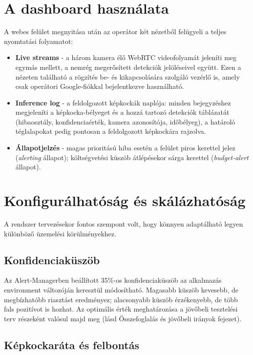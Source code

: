 \section{A dashboard használata}

A webes felület megnyitása után az operátor két nézetből felügyeli a teljes nyomtatási folyamatot:

\begin{itemize}
    \item \textbf{Live streams} - a három kamera élő WebRTC videofolyamát jeleníti meg egymás mellett, a nemrég megerősített
          detekciók jelöléseivel együtt. Ezen a nézeten található a rögzítés be- és kikapcsolására szolgáló vezérlő is,
          amely csak operátori Google-fiókkal bejelentkezve használható.
    \item \textbf{Inference log} - a feldolgozott képkockák naplója: minden bejegyzéshez megjeleníti a képkocka-bélyeget és
          a hozzá tartozó detekciók táblázatát (hibaosztály, konfidenciaérték, kamera azonosítója, időbélyeg), a határoló téglalapokat
          pedig pontosan a feldolgozott képkockára rajzolva.
    \item \textbf{Állapotjelzés} - magas prioritású hiba esetén a felület piros kerettel jelez (\textit{alerting}
          állapot); költségvetési küszöb átlépésekor sárga kerettel (\textit{budget-alert} állapot).
\end{itemize}

\section{Konfigurálhatóság és skálázhatóság}

A rendszer tervezésekor fontos szempont volt, hogy könnyen adaptálható legyen különböző üzemelési körülményekhez.

\subsection{Konfidenciaküszöb}

Az Alert-Managerben beállított 35\%-os konfidenciaküszöb az alkalmazás environment változóján keresztül módosítható.
Magasabb küszöb kevesebb, de megbízhatóbb riasztást eredményez; alacsonyabb küszöb érzékenyebb, de több fals pozitívot
is hozhat. Az optimális érték meghatározása a jövőbeli tesztelési terv részeként valósul majd meg (lásd Összefoglalás és jövőbeli irányok fejezet).

\subsection{Képkockaráta és felbontás}

